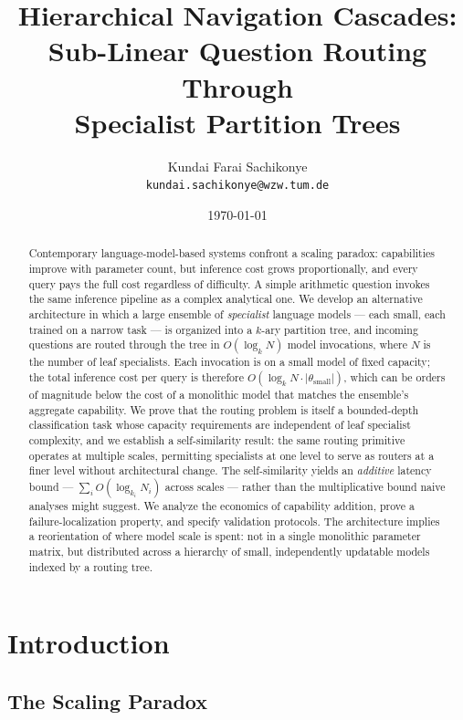 \documentclass[11pt,a4paper]{article}
\title{Hierarchical Navigation Cascades:\\
Sub-Linear Question Routing Through\\
Specialist Partition Trees}
\author{Kundai Farai Sachikonye\\
\texttt{kundai.sachikonye@wzw.tum.de}}
\date{\today}
\theoremstyle{definition}
\theoremstyle{remark}
\begin{document}
\maketitle

\begin{abstract}
Contemporary language-model-based systems confront a scaling paradox: capabilities improve with parameter count, but inference cost grows proportionally, and every query pays the full cost regardless of difficulty. A simple arithmetic question invokes the same inference pipeline as a complex analytical one. We develop an alternative architecture in which a large ensemble of \emph{specialist} language models --- each small, each trained on a narrow task --- is organized into a $k$-ary partition tree, and incoming questions are routed through the tree in $O(\log_k N)$ model invocations, where $N$ is the number of leaf specialists. Each invocation is on a small model of fixed capacity; the total inference cost per query is therefore $O(\log_k N \cdot |\theta_{\text{small}}|)$, which can be orders of magnitude below the cost of a monolithic model that matches the ensemble's aggregate capability. We prove that the routing problem is itself a bounded-depth classification task whose capacity requirements are independent of leaf specialist complexity, and we establish a self-similarity result: the same routing primitive operates at multiple scales, permitting specialists at one level to serve as routers at a finer level without architectural change. The self-similarity yields an \emph{additive} latency bound --- $\sum_i O(\log_{k_i} N_i)$ across scales --- rather than the multiplicative bound naive analyses might suggest. We analyze the economics of capability addition, prove a failure-localization property, and specify validation protocols. The architecture implies a reorientation of where model scale is spent: not in a single monolithic parameter matrix, but distributed across a hierarchy of small, independently updatable models indexed by a routing tree.
\end{abstract}

\section{Introduction}
\label{sec:intro}

\subsection{The Scaling Paradox}
\end{document}
